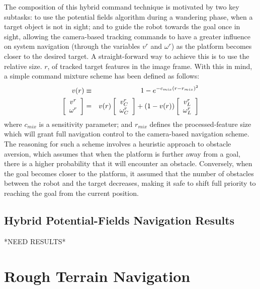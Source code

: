 	The composition of this hybrid command technique is motivated by two key subtasks: to use the potential fields algorithm during a wandering phase, when a target object is not in sight; and to guide the robot towards the goal once in sight, allowing the camera-based tracking commands to have a greater influence on system navigation (through the variables $v^{r}$ and $\omega^{r}$) as the platform becomes closer to the desired target. A straight-forward way to achieve this is to use the relative size. $r$, of tracked target features in the image frame. With this in mind, a simple command mixture scheme has been defined as follows:
	\begin{eqnarray}
		v(r) &\equiv&  1 - e^{ -c_{mix} \left( r - r_{mix}\right)^{2} } 								\nonumber \\
				\left[\begin{array}{c} v^{r} 	\\ \omega^{r} 		\end{array} \right] &=& 	
		v(r)	\left[\begin{array}{c} v^{r}_{C}\\ \omega^{r}_{C} 	\end{array} \right] + 
		(1-v(r))\left[\begin{array}{c} v^{r}_{L}\\ \omega^{r}_{L} 	\end{array} \right] 
	\end{eqnarray}
	where $c_{mix}$ is a sensitivity parameter; and $r_{mix}$ defines the processed-feature size which will grant full navigation control to the camera-based navigation scheme. The reasoning for such a scheme involves a heuristic approach to obstacle aversion, which assumes that when the platform is further away from a goal, there is a higher probability that it will encounter an obstacle. Conversely, when the goal becomes closer to the platform, it assumed that the number of obstacles between the robot and the target decreases, making it safe to shift full priority to reaching the goal from the current position.


	\subsection{Hybrid Potential-Fields Navigation Results}
	*NEED RESULTS*



	\section{Rough Terrain Navigation}

